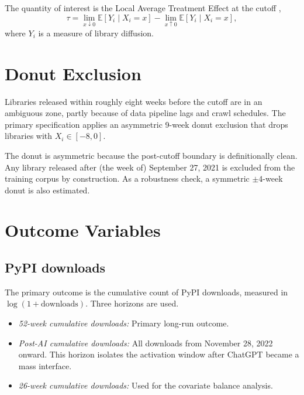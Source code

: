 \documentclass[12pt, a4paper]{report}
\begin{document}
The quantity of interest is the Local Average Treatment Effect at the cutoff \citep[LATE;][]{hahn2001identification},
$$\tau = \lim_{x \downarrow 0} \mathbb{E}[Y_i \mid X_i = x] - \lim_{x \uparrow 0} \mathbb{E}[Y_i \mid X_i = x],$$
where $Y_i$ is a measure of library diffusion.

\section{Donut Exclusion}\label{sec:methods-donut}
Libraries released within roughly eight weeks before the cutoff are in an ambiguous zone, partly because of data pipeline lags and crawl schedules. The primary specification applies an asymmetric 9-week donut exclusion that drops libraries with $X_i \in [-8, 0]$.

The donut is asymmetric because the post-cutoff boundary is definitionally clean. Any library released after (the week of) September 27, 2021 is excluded from the training corpus by construction. As a robustness check, a symmetric $\pm 4$-week donut is also estimated.

\section{Outcome Variables}\label{sec:methods-outcomes}

\subsection{PyPI downloads}\label{subsec:methods-pypi-outcomes}
The primary outcome is the cumulative count of PyPI downloads, measured in $\log(1 + \text{downloads})$. Three horizons are used.

\begin{itemize}
   \item \textit{52-week cumulative downloads:} Primary long-run outcome.
   \item \textit{Post-AI cumulative downloads:} All downloads from
     November 28, 2022 onward. This horizon isolates the activation window after ChatGPT became a mass interface.
   \item \textit{26-week cumulative downloads:} Used for the covariate
     balance analysis.
\end{itemize}
\end{document}
